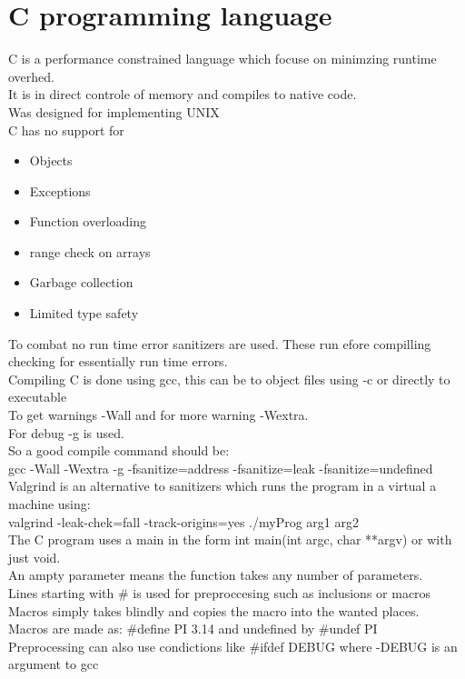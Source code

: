 \documentclass[12pt, a4paper]{article}
\begin{document}
	\section{C programming language}
		C is a performance constrained language which focuse on minimzing runtime overhed.\\
		It is in direct controle of memory and compiles to native code.\\
		Was designed for implementing UNIX\\
		C has no support for
		\begin{itemize}
			\item Objects
			\item Exceptions
			\item Function overloading
			\item range check on arrays
			\item Garbage collection
			\item Limited type safety
		\end{itemize}
		To combat no run time error sanitizers are used. These run efore compilling checking for essentially run time errors.\\
		Compiling C is done using gcc, this can be to object files using -c or directly to executable\\
		To get warnings -Wall and for more warning -Wextra.\\
		For debug -g is used.\\
		So a good compile command should be:\\
		gcc -Wall -Wextra -g -fsanitize=address -fsanitize=leak -fsanitize=undefined\\
		Valgrind is an alternative to sanitizers which runs the program in a virtual a machine using:\\
		valgrind -leak-chek=fall -track-origins=yes ./myProg arg1 arg2\\
		The C program uses a main in the form int main(int argc, char **argv) or with just void.\\
		An ampty parameter means the function takes any number of parameters.\\
		Lines starting with \# is used for preproccesing such as inclusions or macros\\
		Macros simply takes blindly and copies the macro into the wanted places.\\
		Macros are made as: \#define PI 3.14 and undefined by \#undef PI\\
		Preprocessing can also use condictions like \#ifdef DEBUG where -DEBUG is an argument to gcc\\
\end{document}

